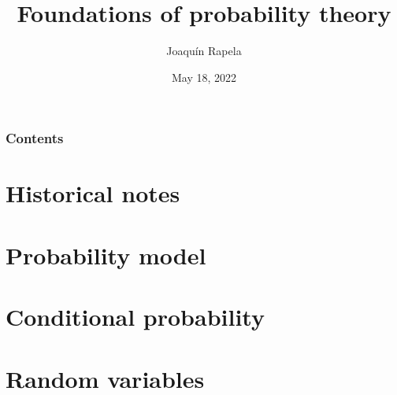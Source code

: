 \title{Foundations of probability theory}

\author{Joaqu\'{i}n Rapela} %
\date{May 18, 2022} %




\begin{frame}
\titlepage %
\end{frame}

\begin{frame}
\frametitle{Contents} %
\tableofcontents %
\end{frame}

\section{Historical notes}

\section{Probability model}

\section{Conditional probability}

\section{Random variables}

